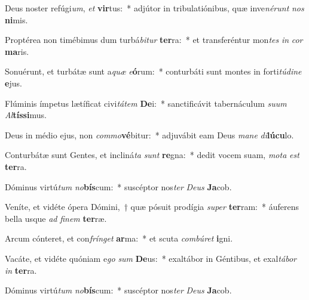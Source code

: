 \item Deus noster refúgi\textit{um}, \textit{et} \textbf{vir}tus:~* adjútor in tribulatiónibus, quæ inve\textit{né}\textit{runt} \textit{nos} \textbf{ni}mis.
\item Proptérea non timébimus dum turbá\textit{bi}\textit{tur} \textbf{ter}ra:~* et transferéntur mon\textit{tes} \textit{in} \textit{cor} \textbf{ma}ris.
\item Sonuérunt, et turbátæ sunt a\textit{quæ} \textit{e}\textbf{ó}rum:~* conturbáti sunt montes in forti\textit{tú}\textit{di}\textit{ne} \textbf{e}jus.
\item Flúminis ímpetus lætíficat civi\textit{tá}\textit{tem} \textbf{De}i:~* sanctificávit tabernáculum \textit{su}\textit{um} \textit{Al}\textbf{tís}\textbf{si}mus.
\item Deus in médio ejus, non \textit{com}\textit{mo}\textbf{vé}bitur:~* adjuvábit eam Deus \textit{ma}\textit{ne} \textit{di}\textbf{lú}\textbf{cu}lo.
\item Conturbátæ sunt Gentes, et incliná\textit{ta} \textit{sunt} \textbf{re}gna:~* dedit vocem suam, \textit{mo}\textit{ta} \textit{est} \textbf{ter}ra.
\item Dóminus virtú\textit{tum} \textit{no}\textbf{bís}cum:~* suscéptor nos\textit{ter} \textit{De}\textit{us} \textbf{Ja}cob.
\item Veníte, et vidéte ópera Dómini,~† quæ pósuit prodígia \textit{su}\textit{per} \textbf{ter}ram:~* áuferens bella usque \textit{ad} \textit{fi}\textit{nem} \textbf{ter}ræ.
\item Arcum cónteret, et con\textit{frín}\textit{get} \textbf{ar}ma:~* et scuta \textit{com}\textit{bú}\textit{ret} \textbf{i}gni.
\item Vacáte, et vidéte quóniam e\textit{go} \textit{sum} \textbf{De}us:~* exaltábor in Géntibus, et exal\textit{tá}\textit{bor} \textit{in} \textbf{ter}ra.
\item Dóminus virtú\textit{tum} \textit{no}\textbf{bís}cum:~* suscéptor nos\textit{ter} \textit{De}\textit{us} \textbf{Ja}cob.
